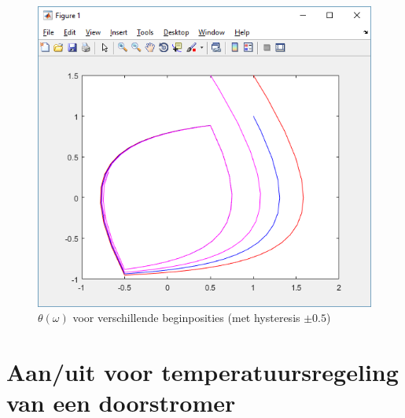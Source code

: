 \documentclass[12pt]{article}
\begin{document}
\begin{figure}
	\centering
	\includegraphics[height=0.4\textheight, keepaspectratio]{xydriehyssmaller.png}
	\caption{$\theta(\omega)$ voor verschillende beginposities (met hysteresis $\pm 0.5$)}
	\label{xydriehys}
\end{figure}
\clearpage
\part{Aan/uit voor temperatuursregeling van een doorstromer}
\setcounter{section}{0}
\end{document}
